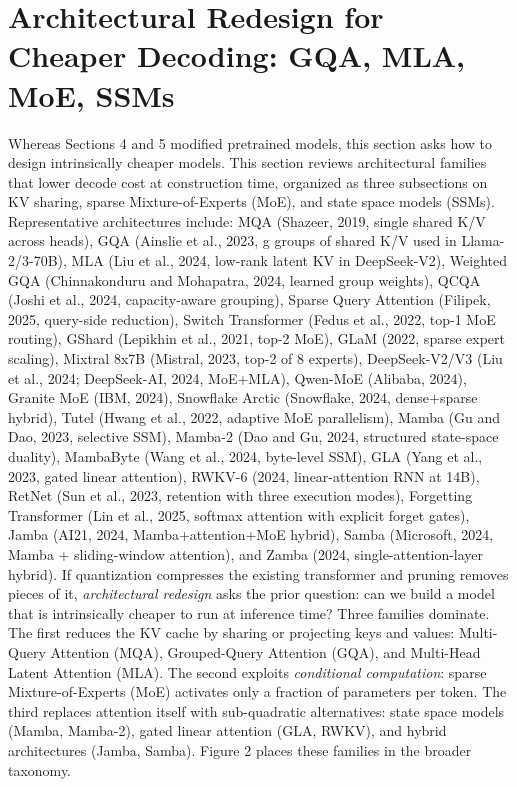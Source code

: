 \documentclass{article}
\begin{document}
\section{Architectural Redesign for Cheaper Decoding: GQA, MLA, MoE, SSMs}\label{architectural-redesign-for-cheaper-decoding-gqa-mla-moe-ssms}

Whereas Sections 4 and 5 modified pretrained models, this section asks how to design intrinsically cheaper models. This section reviews architectural families that lower decode cost at construction time, organized as three subsections on KV sharing, sparse Mixture-of-Experts (MoE), and state space models (SSMs). Representative architectures include: MQA (Shazeer, 2019, single shared K/V across heads), GQA (Ainslie et al., 2023, g groups of shared K/V used in Llama-2/3-70B), MLA (Liu et al., 2024, low-rank latent KV in DeepSeek-V2), Weighted GQA (Chinnakonduru and Mohapatra, 2024, learned group weights), QCQA (Joshi et al., 2024, capacity-aware grouping), Sparse Query Attention (Filipek, 2025, query-side reduction), Switch Transformer (Fedus et al., 2022, top-1 MoE routing), GShard (Lepikhin et al., 2021, top-2 MoE), GLaM (2022, sparse expert scaling), Mixtral 8x7B (Mistral, 2023, top-2 of 8 experts), DeepSeek-V2/V3 (Liu et al., 2024; DeepSeek-AI, 2024, MoE+MLA), Qwen-MoE (Alibaba, 2024), Granite MoE (IBM, 2024), Snowflake Arctic (Snowflake, 2024, dense+sparse hybrid), Tutel (Hwang et al., 2022, adaptive MoE parallelism), Mamba (Gu and Dao, 2023, selective SSM), Mamba-2 (Dao and Gu, 2024, structured state-space duality), MambaByte (Wang et al., 2024, byte-level SSM), GLA (Yang et al., 2023, gated linear attention), RWKV-6 (2024, linear-attention RNN at 14B), RetNet (Sun et al., 2023, retention with three execution modes), Forgetting Transformer (Lin et al., 2025, softmax attention with explicit forget gates), Jamba (AI21, 2024, Mamba+attention+MoE hybrid), Samba (Microsoft, 2024, Mamba + sliding-window attention), and Zamba (2024, single-attention-layer hybrid). If quantization compresses the existing transformer and pruning removes pieces of it, \emph{architectural redesign} asks the prior question: can we build a model that is intrinsically cheaper to run at inference time? Three families dominate. The first reduces the KV cache by sharing or projecting keys and values: Multi-Query Attention (MQA), Grouped-Query Attention (GQA), and Multi-Head Latent Attention (MLA). The second exploits \emph{conditional computation}: sparse Mixture-of-Experts (MoE) activates only a fraction of parameters per token. The third replaces attention itself with sub-quadratic alternatives: state space models (Mamba, Mamba-2), gated linear attention (GLA, RWKV), and hybrid architectures (Jamba, Samba). Figure 2 places these families in the broader taxonomy.
\end{document}

